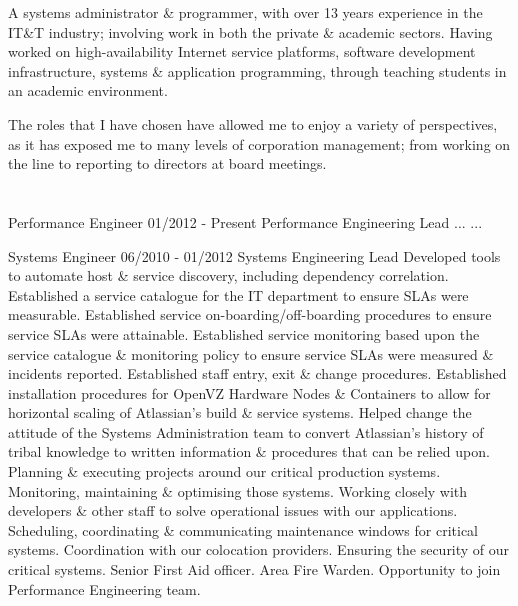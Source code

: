 
A {\mb systems administrator} \& {\mb programmer}, with over 13 years experience in the IT\&T industry; involving work in both the private \& academic sectors. Having worked on high-availability Internet service platforms, software development infrastructure, systems \& application programming, through teaching students in an academic environment.

The roles that I have chosen have allowed me to enjoy a variety of perspectives, as it has exposed me to many levels of corporation management; from working on the line to reporting to directors at board meetings.


\section{\ATL}

\lskip
{} Performance Engineer
 01/2012 - Present
 Performance Engineering Lead
 ...
 ...
\pskip

 Systems Engineer
\lskip
{} 06/2010 - 01/2012
 Systems Engineering Lead
 Developed tools to automate host \& service discovery, including dependency correlation.
\dashtopic Established a service catalogue for the IT department to ensure SLAs were measurable.
\dashtopic Established service on-boarding/off-boarding procedures to ensure service SLAs were attainable.
\dashtopic Established service monitoring based upon the service catalogue \& monitoring policy to ensure service SLAs were measured \& incidents reported.
\dashtopic Established staff entry, exit \& change procedures.
\dashtopic Established installation procedures for OpenVZ Hardware Nodes \& Containers to allow for horizontal scaling of Atlassian's build \& service systems.
\dashtopic Helped change the attitude of the Systems Administration team to convert Atlassian's history of tribal knowledge to written information \& procedures that can be relied upon.
 Planning \& executing projects around our critical production systems.
\dashtopic Monitoring, maintaining \& optimising those systems.
\dashtopic Working closely with developers \& other staff to solve operational issues with our applications.
\dashtopic Scheduling, coordinating \& communicating maintenance windows for critical systems.
\dashtopic Coordination with our colocation providers.
\dashtopic Ensuring the security of our critical systems.
\dashtopic Senior First Aid officer.
\dashtopic Area Fire Warden.
 Opportunity to join Performance Engineering team.
\pskip

